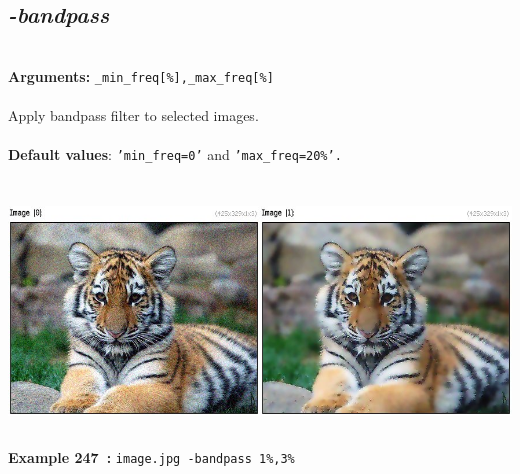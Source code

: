 \documentclass[a4paper,11pt,twoside]{book}
\begin{document}
\subsection{\emph{-bandpass} }\vspace*{-0.5em}
~\\\textbf{Arguments: } 
{\small \texttt{\_min\_freq[\%],\_max\_freq[\%]}}\\~\\
Apply bandpass filter to selected images.
~\\~\\\textbf{Default values}: {\small \texttt{'min\_freq=0'} and \texttt{'max\_freq=20\%'.}}
\begin{center}\includegraphics[keepaspectratio=true,height=7cm,width=\textwidth]{img/gmic_def247.jpg}\\
{\footnotesize \textbf{Example 247~:} \texttt{image.jpg -bandpass 1\%,3\%}}
\end{center}
\end{document}
